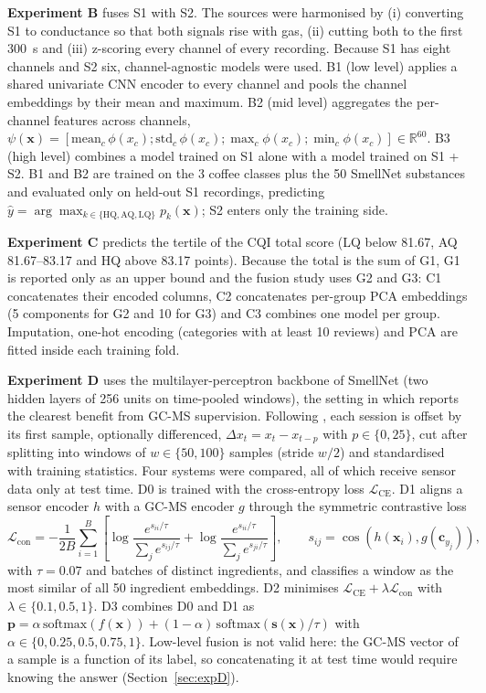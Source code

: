 \textbf{Experiment B} fuses S1 with S2. The sources were harmonised by (i) converting S1 to conductance so that both signals rise with gas, (ii) cutting both to the first 300~s and (iii) z-scoring every channel of every recording. Because S1 has eight channels and S2 six, channel-agnostic models were used. B1 (low level) applies a shared univariate CNN encoder to every channel and pools the channel embeddings by their mean and maximum. B2 (mid level) aggregates the per-channel features across channels, $\psi(\mathbf{x}) = [\mathrm{mean}_c\,\phi(x_c); \mathrm{std}_c\,\phi(x_c); \max_c \phi(x_c); \min_c \phi(x_c)] \in \mathbb{R}^{60}$. B3 (high level) combines a model trained on S1 alone with a model trained on S1 + S2. B1 and B2 are trained on the 3 coffee classes plus the 50 SmellNet substances and evaluated only on held-out S1 recordings, predicting $\hat{y} = \arg\max_{k \in \{\mathrm{HQ}, \mathrm{AQ}, \mathrm{LQ}\}} p_k(\mathbf{x})$; S2 enters only the training side.

\textbf{Experiment C} predicts the tertile of the CQI total score (LQ below 81.67, AQ 81.67--83.17 and HQ above 83.17 points). Because the total is the sum of G1, G1 is reported only as an upper bound and the fusion study uses G2 and G3: C1 concatenates their encoded columns, C2 concatenates per-group PCA embeddings (5 components for G2 and 10 for G3) and C3 combines one model per group. Imputation, one-hot encoding (categories with at least 10 reviews) and PCA are fitted inside each training fold.

\textbf{Experiment D} uses the multilayer-perceptron backbone of SmellNet (two hidden layers of 256 units on time-pooled windows), the setting in which \cite{feng2026smellnet} reports the clearest benefit from GC-MS supervision. Following \cite{feng2026smellnet}, each session is offset by its first sample, optionally differenced, $\Delta x_t = x_t - x_{t-p}$ with $p \in \{0, 25\}$, cut after splitting into windows of $w \in \{50, 100\}$ samples (stride $w/2$) and standardised with training statistics. Four systems were compared, all of which receive sensor data only at test time. D0 is trained with the cross-entropy loss $\mathcal{L}_{\mathrm{CE}}$. D1 aligns a sensor encoder $h$ with a GC-MS encoder $g$ through the symmetric contrastive loss
\begin{equation}
\mathcal{L}_{\mathrm{con}} = -\frac{1}{2B} \sum_{i=1}^{B} \left[ \log \frac{e^{s_{ii}/\tau}}{\sum_{j} e^{s_{ij}/\tau}} + \log \frac{e^{s_{ii}/\tau}}{\sum_{j} e^{s_{ji}/\tau}} \right], \qquad s_{ij} = \cos\left(h(\mathbf{x}_i), g(\mathbf{c}_{y_j})\right),
\end{equation}
with $\tau = 0.07$ and batches of distinct ingredients, and classifies a window as the most similar of all 50 ingredient embeddings. D2 minimises $\mathcal{L}_{\mathrm{CE}} + \lambda \mathcal{L}_{\mathrm{con}}$ with $\lambda \in \{0.1, 0.5, 1\}$. D3 combines D0 and D1 as $\mathbf{p} = \alpha\,\mathrm{softmax}(f(\mathbf{x})) + (1-\alpha)\,\mathrm{softmax}(\mathbf{s}(\mathbf{x})/\tau)$ with $\alpha \in \{0, 0.25, 0.5, 0.75, 1\}$. Low-level fusion is not valid here: the GC-MS vector of a sample is a function of its label, so concatenating it at test time would require knowing the answer (Section~\ref{sec:expD}).

